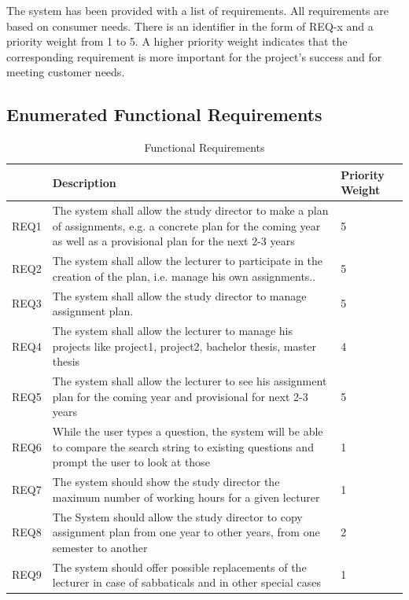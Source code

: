 \documentclass{scrartcl}
\begin{document}
	
 The system has been provided with a list of requirements. All requirements are based on consumer needs. There is an identifier in the form of REQ-x and a priority weight from 1 to 5. A higher priority weight indicates that the corresponding requirement is more important for the project's success and for meeting customer needs.
\subsection{Enumerated Functional Requirements}
\begin{table}[H]
\begin{center}
\begin{tabular}{|p{2.5cm} |p{7.5cm} | p{2.5cm} | }
\hline
\textbf{}  & \textbf{Description} & \textbf{Priority Weight}\\
\hline
REQ1 & The system shall allow the study director to make a plan of assignments, e.g. a concrete plan for the coming year as well as a provisional plan for the next 2-3 years      		&  5 \\ \hline
REQ2  &    The system shall allow the lecturer to participate in the creation of the plan, i.e. manage his own assignments..        	& 5 \\ \hline
REQ3  &    The system shall allow the study director to manage assignment plan.       	&5\\ \hline
REQ4   &      The system shall allow the lecturer to manage his projects like project1, project2, bachelor thesis, master thesis     		& 4 \\ \hline
REQ5   &      The system shall allow the lecturer to see his assignment plan for the coming year and provisional for next 2-3 years     		& 5\\ \hline

REQ6   &       While the user types a question, the system will be able to compare the search string to existing questions and prompt the user to look at those 		& 1\\ \hline
REQ7                &   The system should show the study director the maximum number of working hours for a given lecturer    	&  1\\ \hline
REQ8                &     The System should allow the  study director to copy assignment plan from one year to other years, from one semester to another        	&  2\\ \hline
REQ9            &   The system should offer possible replacements of the lecturer in case of sabbaticals and in other special cases       	& 1\\ \hline


\end{tabular}
\end{center}

\caption{Functional Requirements}
\label{table2}
\end{table}
\end{document}
